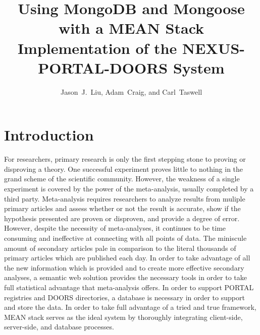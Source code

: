 \documentclass[10pt,twocolumn,twoside]{article}
\date{} %
\author{Jason~J.~Liu, Adam~Craig, and Carl~Taswell}
\title{Using MongoDB and Mongoose with a MEAN Stack Implementation of the NEXUS-PORTAL-DOORS System\\ }
\begin{document}
\maketitle
\thispagestyle{empty}

\section*{Introduction}
\label{secIntroduction}
	For researchers, primary research is only the first stepping stone to proving or disproving a theory. One successful experiment proves little to nothing in the grand scheme of the scientific community. However, the weakness of a single experiment is covered by the power of the meta-analysis, usually completed by a third party. Meta-analysis requires researchers to analyze results from muliple primary articles and assess whether or not the result is accurate, show if the hypothesis presented are proven or disproven, and provide a degree of error. However, despite the necessity of meta-analyses, it continues to be time consuming and ineffective at connecting with all points of data. The miniscule amount of secondary articles pale in comparison to the literal thousands of primary articles which are published each day. In order to take advantage of all the new information which is provided and to create more effective secondary analyses, a semantic web solution provides the necessary tools in order to take full statistical advantage that meta-analysis offers. 
 \newline
	In order to support PORTAL registries and DOORS directories, a database is necessary in order to support and store the data. In order to take full advantage of a tried and true framework, MEAN stack serves as the ideal system by thoroughly integrating client-side, server-side, and database processes. 
\end{document}
